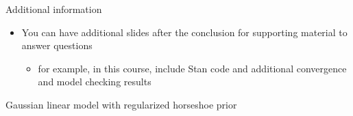\documentclass[english,t]{beamer}
\begin{document}
\begin{frame}[fragile]

  {\Large\color{navyblue} Additional information}

  \begin{itemize}
  \item You can have additional slides after the conclusion for
    supporting material to answer questions
    \begin{itemize}
    \item for example, in this course, include Stan code and
      additional convergence and model checking results
    \end{itemize}
  \end{itemize}

Gaussian linear model with regularized horseshoe prior
  

\end{frame}
\end{document}

